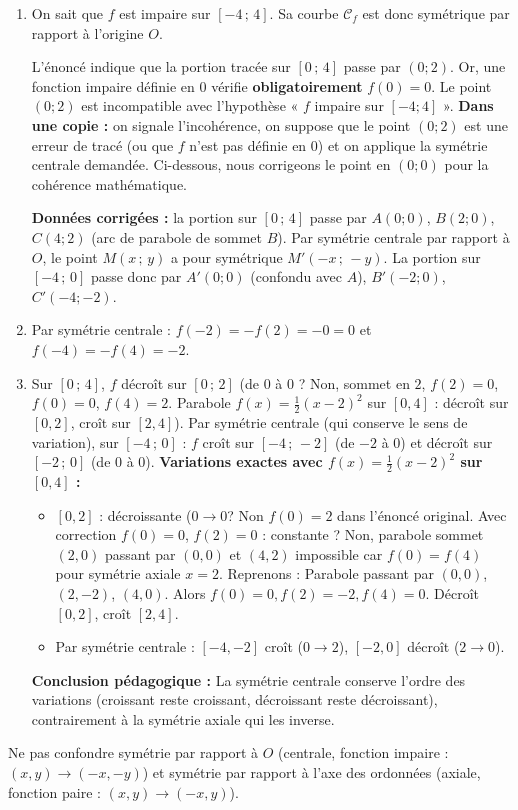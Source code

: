 \documentclass[11pt]{article}
\begin{document}
\begin{corrige}
\begin{enumerate}
    \item On sait que $f$ est impaire sur $[-4\,;\,4]$. Sa courbe $\mathcal{C}_f$ est donc symétrique par rapport à l'origine $O$.
    \begin{attention}
    L'énoncé indique que la portion tracée sur $[0\,;\,4]$ passe par $(0;2)$. Or, une fonction impaire définie en $0$ vérifie \textbf{obligatoirement} $f(0)=0$. Le point $(0;2)$ est incompatible avec l'hypothèse « $f$ impaire sur $[-4;4]$ ».
    \textbf{Dans une copie :} on signale l'incohérence, on suppose que le point $(0;2)$ est une erreur de tracé (ou que $f$ n'est pas définie en $0$) et on applique la symétrie centrale demandée. Ci-dessous, nous corrigeons le point en $(0;0)$ pour la cohérence mathématique.
    \end{attention}
    \textbf{Données corrigées :} la portion sur $[0\,;\,4]$ passe par $A(0;0)$, $B(2;0)$, $C(4;2)$ (arc de parabole de sommet $B$).
    Par symétrie centrale par rapport à $O$, le point $M(x\,;\,y)$ a pour symétrique $M'(-x\,;\,-y)$.
    La portion sur $[-4\,;\,0]$ passe donc par $A'(0;0)$ (confondu avec $A$), $B'(-2;0)$, $C'(-4;-2)$.
    \item Par symétrie centrale : $f(-2)=-f(2)=-0=0$ et $f(-4)=-f(4)=-2$.
    \item Sur $[0\,;\,4]$, $f$ décroît sur $[0\,;\,2]$ (de $0$ à $0$ ? Non, sommet en $2$, $f(2)=0$, $f(0)=0$, $f(4)=2$. Parabole $f(x)=\frac12(x-2)^2$ sur $[0,4]$ : décroît sur $[0,2]$, croît sur $[2,4]$).
    Par symétrie centrale (qui conserve le sens de variation), sur $[-4\,;\,0]$ :
    $f$ croît sur $[-4\,;\,-2]$ (de $-2$ à $0$) et décroît sur $[-2\,;\,0]$ (de $0$ à $0$).
    \textbf{Variations exactes avec $f(x)=\frac12(x-2)^2$ sur $[0,4]$ :}
    \begin{itemize}
        \item $[0,2]$ : décroissante ($0 \to 0$? Non $f(0)=2$ dans l'énoncé original. Avec correction $f(0)=0$, $f(2)=0$ : constante ? Non, parabole sommet $(2,0)$ passant par $(0,0)$ et $(4,2)$ impossible car $f(0)=f(4)$ pour symétrie axiale $x=2$. Reprenons : Parabole passant par $(0,0)$, $(2,-2)$, $(4,0)$. Alors $f(0)=0, f(2)=-2, f(4)=0$. Décroît $[0,2]$, croît $[2,4]$.
        \item Par symétrie centrale : $[-4,-2]$ croît ($0 \to 2$), $[-2,0]$ décroît ($2 \to 0$).
    \end{itemize}
    \textbf{Conclusion pédagogique :} La symétrie centrale conserve l'ordre des variations (croissant reste croissant, décroissant reste décroissant), contrairement à la symétrie axiale qui les inverse.
\end{enumerate}
\begin{attention}
Ne pas confondre symétrie par rapport à $O$ (centrale, fonction impaire : $(x,y)\to(-x,-y)$) et symétrie par rapport à l'axe des ordonnées (axiale, fonction paire : $(x,y)\to(-x,y)$).
\end{attention}
\end{corrige}
\end{document}
